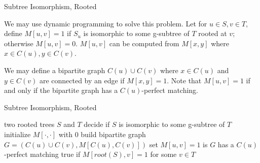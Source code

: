 \documentclass{beamer}
\begin{document}
\begin{frame}{Subtree Isomorphism, Rooted}
\begin{solution}
	We may use dynamic programming to solve this problem. Let for $u \in S, v \in T$, define $M[u, v] = 1$ if $S_u$ is isomorphic to some g-subtree of $T$ rooted at $v$; otherwise $M[u, v] = 0$. $M[u, v]$ can be computed from $M[x, y]$ where $x \in C(u), y \in C(v)$.
\end{solution}

We may define a bipartite graph $C(u) \cup C(v)$ where $x \in C(u)$ and $y \in C(v)$ are connected by an edge if $M[x, y] = 1$. Note that $M[u, v] = 1$ if and only if the bipartite graph has a $C(u)$-perfect matching.
\end{frame}

\begin{frame}{Subtree Isomorphism, Rooted}
\begin{algorithm}[H] 
	\caption{Rooted Subtree Isomorphism} 
	\begin{algorithmic}[1] 
		\Require two rooted trees $S$ and $T$
		\Ensure decide if $S$ is isomorphic to some g-subtree of $T$
		\State initialize $M[\cdot, \cdot]$ with 0
		\State build bipartite graph $G = (C(u) \cup C(v), M[C(u), C(v)])$
		\State set $M[u, v] = 1$ is $G$ has a $C(u)$-perfect matching
		\EndFor
		\EndFor
		\State \Return true if $M[root(S), v] = 1$ for some $v \in T$
	\end{algorithmic} 
\end{algorithm}
\end{frame}
\end{document}
